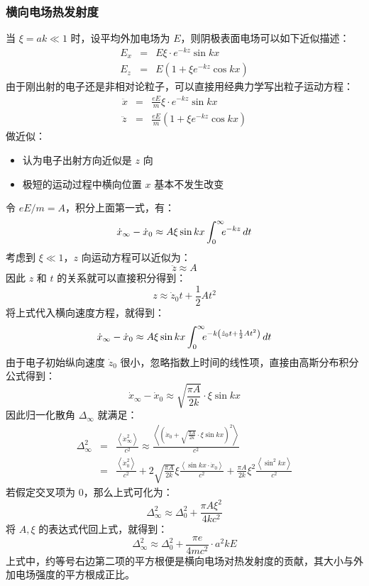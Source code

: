 \subsubsection{横向电场热发射度}
当 $\xi=ak\ll 1$ 时，设平均外加电场为 $E$，则阴极表面电场可以如下近似描述：
\begin{eqnarray*}
E_x &=& E\xi\cdot e^{-kz}\sin kx \\
E_z &=& E\left(1+\xi e^{-kz}\cos kx\right)
\end{eqnarray*}
由于刚出射的电子还是非相对论粒子，可以直接用经典力学写出粒子运动方程：
\begin{eqnarray*}
\ddot{x} &=& \frac{eE}{m}\xi\cdot e^{-kz}\sin kx \\
\ddot{z} &=& \frac{eE}{m}\left(1+\xi e^{-kz}\cos kx\right)
\end{eqnarray*}
做近似：
\begin{itemize}
\item 认为电子出射方向近似是 $z$ 向
\item 极短的运动过程中横向位置 $x$ 基本不发生改变
\end{itemize}
令 $eE/m=A$，积分上面第一式，有：
\[
	\dot{x}_{\infty} - \dot{x}_0 \approx A\xi\sin kx\int_0^{\infty}\!\!\! e^{-kz}\,dt
\]
考虑到 $\xi \ll 1$，$z$ 向运动方程可以近似为：
\[
\ddot{z}\approx A
\]
因此 $z$ 和 $t$ 的关系就可以直接积分得到：
\[
z\approx \dot{z}_0 t + \dfrac{1}{2}At^2
\]
将上式代入横向速度方程，就得到：
\[
	\dot{x}_{\infty} - \dot{x}_0 \approx A\xi\sin kx\int_0^{\infty}\!\!\! e^{-k\left(\dot{z}_0 t + \frac{1}{2}At^2\right)}\,dt
\]
由于电子初始纵向速度 $\dot{z}_0$ 很小，忽略指数上时间的线性项，直接由高斯分布积分公式得到：
\[
	\dot{x}_{\infty} - \dot{x}_0 \approx \sqrt{\frac{\pi A}{2k}}\cdot\xi\sin kx
\]
因此归一化散角 $\Delta_{\infty}$ 就满足：
\begin{eqnarray*}
\Delta_{\infty}^2 &=& \frac{\left\langle\dot{x}_{\infty}^2\right\rangle}{c^2} \approx \frac{\left\langle\left(\dot{x}_0 + \sqrt{\frac{\pi A}{2k}}\cdot\xi\sin kx\right)^2\right\rangle}{c^2} \\
	&=& \frac{\left\langle\dot{x}_{0}^2\right\rangle}{c^2} + 2\sqrt{\frac{\pi A}{2k}}\xi\frac{\left\langle\sin kx\cdot\dot{x}_{0}\right\rangle}{c^2} + \frac{\pi A}{2k}\xi^2\frac{\left\langle\sin^2 kx\right\rangle}{c^2}
\end{eqnarray*}
若假定交叉项为 0，那么上式可化为：
\[
	\Delta_{\infty}^2 \approx \Delta_{0}^2 + \frac{\pi A\xi^2}{4kc^2}
\]
将 $A,\xi$ 的表达式代回上式，就得到：
\[
	\Delta_{\infty}^2 \approx \Delta_{0}^2 + \frac{\pi e}{4mc^2}\cdot a^2kE
\]
上式中，约等号右边第二项的平方根便是横向电场对热发射度的贡献，其大小与外加电场强度的平方根成正比。

